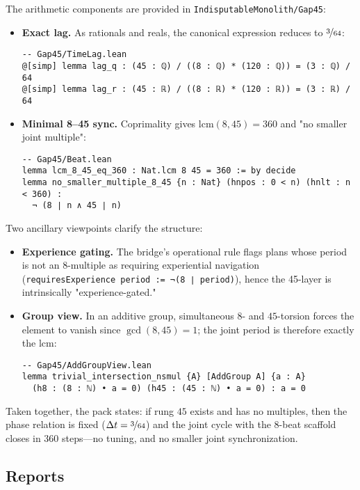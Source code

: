 \documentclass[11pt,a4paper,twoside]{article}
\numberwithin{equation}{section}
\theoremstyle{customthm}
\theoremstyle{customdef}
\theoremstyle{customrem}
\begin{document}
The arithmetic components are provided in \texttt{IndisputableMonolith/Gap45}:
\begin{itemize}[leftmargin=*]
  \item \textbf{Exact lag.} As rationals and reals, the canonical expression reduces to $\nicefrac{3}{64}$:
\begin{lstlisting}
-- Gap45/TimeLag.lean
@[simp] lemma lag_q : (45 : ℚ) / ((8 : ℚ) * (120 : ℚ)) = (3 : ℚ) / 64
@[simp] lemma lag_r : (45 : ℝ) / ((8 : ℝ) * (120 : ℝ)) = (3 : ℝ) / 64
\end{lstlisting}
  \item \textbf{Minimal 8–45 sync.} Coprimality gives $\mathrm{lcm}(8,45)=360$ and "no smaller joint multiple":
\begin{lstlisting}
-- Gap45/Beat.lean
lemma lcm_8_45_eq_360 : Nat.lcm 8 45 = 360 := by decide
lemma no_smaller_multiple_8_45 {n : Nat} (hnpos : 0 < n) (hnlt : n < 360) :
  ¬ (8 ∣ n ∧ 45 ∣ n)
\end{lstlisting}
\end{itemize}

Two ancillary viewpoints clarify the structure:
\begin{itemize}[leftmargin=*]
  \item \textbf{Experience gating.} The bridge's operational rule flags plans whose period is not an 8-multiple as requiring experiential navigation (\texttt{requiresExperience period := ¬(8 ∣ period)}), hence the 45-layer is intrinsically "experience-gated."
  \item \textbf{Group view.} In an additive group, simultaneous $8$- and $45$-torsion forces the element to vanish since $\gcd(8,45)=1$; the joint period is therefore exactly the $\mathrm{lcm}$:
\begin{lstlisting}
-- Gap45/AddGroupView.lean
lemma trivial_intersection_nsmul {A} [AddGroup A] {a : A}
  (h8 : (8 : ℕ) • a = 0) (h45 : (45 : ℕ) • a = 0) : a = 0
\end{lstlisting}
\end{itemize}

Taken together, the pack states: if rung $45$ exists and has no multiples, then the phase relation is fixed ($\Delta t=\nicefrac{3}{64}$) and the joint cycle with the $8$-beat scaffold closes in $360$ steps—no tuning, and no smaller joint synchronization.

\subsection{Reports}\label{subsec:gap45-reports}
\end{document}
